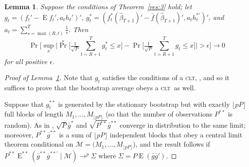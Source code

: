 \documentclass[10pt,fleqn,draft]{article}
\newtheorem{lema}{Lemma}[section]
\theoremstyle{definition}
\DeclareMathOperator{\E}{E}
\DeclareMathOperator{\pr}{Pr}
\newcommand{\clt}{\textsc{clt}}
\begin{document}
\begin{lema}\label{res:a3}
  Suppose the conditions of Theorem~\ref{res:3} hold; let $g_{t} =
  (f_{t}' - \E f_{t}', a_t h_{t}')'$, $g_t^{*} =
  (f_t^{*}(\hat{\beta}_{T+1})' - \bar{f}(\hat{\beta}_{T+1})', a_t
  h_t^{*\prime})'$, and $a_t = \sum_{s=\max(R,t)}^T \tfrac{1}{s}$.  Then
  \begin{equation}\label{eq:1}
    \pr\Big[\sup_x \Big| \pr^{*}\Big[ \tfrac{1}{\sqrt{P}} \sum_{t=R+1}^T g_{t}^{*}
    \leq x \Big] - \pr\Big[ \tfrac{1}{\sqrt{P}} \sum_{t=R+1}^T g_{t}
    \leq x \Big] \Big| > \epsilon \Big] \to 0
  \end{equation}
  for all positive $\epsilon$.
\end{lema}

\begin{proof}[Proof of Lemma~\ref{res:a3}]
  Note that $g_t$ satisfies the conditions of a \clt,
  \citep[Theorem~2]{Jon:97}, and so it suffices to prove that the
  bootstrap average obeys a \clt\ as well.

  Suppose that $g_t^{**}$ is generated by the stationary bootstrap but
  with exactly $\lfloor p P \rfloor$ full blocks of length
  $M_1,\dots,M_{\lfloor p P \rfloor}$ (so that the number of
  observations $P^{**}$ is random).  As in \citet{Cal:11d}, $\sqrt{P}
  \bar{g}^{*}$ and $\sqrt{P^{**}} \bar{g}^{**}$ converge in
  distribution to the same limit; moreover, $P^{**} \bar{g}^{**}$ is a
  sum of $\lfloor p P \rfloor$ independent blocks that obey a central
  limit theorem conditional on $\mathcal{M} = (M_1,\dots,M_{\lfloor p
    P \rfloor}$), and the result follows if $P^{**}
  \E^{**}(\bar{g}^{**} \bar{g}^{**\prime} \mid \mathcal{M}) \to^p
  \Sigma$ where $\Sigma = P \E(\bar{g} \bar{g}')$.


\end{proof}
\end{document}
